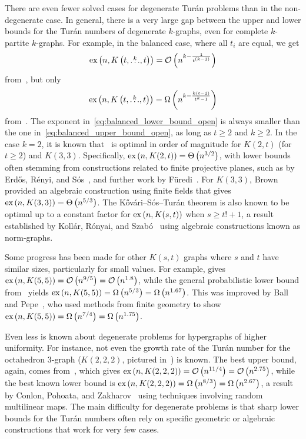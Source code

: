 There are even fewer solved cases for degenerate Turán problems than in the non-degenerate case.
In general, there is a very large gap between the upper and lower bounds for the Turán numbers of degenerate $k$-graphs,
even for complete $k$-partite $k$-graphs.
For example, in the balanced case, where all $t_i$ are equal, we get
\begin{equation} \label{eq:balanced_upper_bound_open}
    \text{ex} \left( n, K\left(t, \overset{k}{\dots}, t\right) \right) = \mathcal{O}\left(n^{k - \frac{1}{t^{(k-1)}}}\right)
\end{equation}
from~, but only
\begin{equation} \label{eq:balanced_lower_bound_open}
    \text{ex} \left( n, K\left(t, \overset{k}{\dots}, t\right) \right) = \Omega\left(n^{k - \frac{k(t-1)}{t^k - 1}}\right)
\end{equation}
from~.
The exponent in~\eqref{eq:balanced_lower_bound_open} is always
smaller than the one in~\eqref{eq:balanced_upper_bound_open},
as long as $t \geq 2$ and $k \geq 2$.
In the case $k=2$, it is known that~ is optimal in order of magnitude for $K(2, t)$ (for $t \geq 2$) and $K(3, 3)$.
Specifically, $\text{ex} \left( n, K(2, t) \right) = \Theta\left(n^{3/2}\right)$,
with lower bounds often stemming from constructions related to finite projective planes,
such as by Erdős, Rényi, and Sós~\cite{erdHos1966problem}, and further work by Füredi~\cite{furedi1996new}.
For $K(3,3)$, Brown~\cite{brown1966graphs} provided an algebraic construction using finite fields that gives
$\text{ex} \left( n, K(3, 3) \right) = \Theta\left(n^{5/3}\right)$.
The Kővári–Sós–Turán theorem is also known to be optimal up to a constant factor for $\text{ex} \left( n, K(s,t) \right)$ when $s \ge t!+1$, a result established by Kollár, Rónyai, and Szabó~\cite{kollar1996norm} using algebraic constructions known as norm-graphs.

Some progress has been made for other $K(s, t)$ graphs where $s$ and $t$ have similar sizes, particularly for small values.
For example,  gives
$\text{ex} \left( n, K(5,5) \right) = \mathcal{O}\left(n^{9/5}\right) = \mathcal{O}\left(n^{1.8}\right)$,
while the general probabilistic lower bound from~ yields
$\text{ex} \left( n, K(5,5) \right) = \Omega\left(n^{5/3}\right) = \Omega\left(n^{1.67}\right)$.
This was improved by Ball and Pepe~\cite{ball2012asymptotic}, who used methods from finite geometry to show $\text{ex} \left( n, K(5,5) \right) = \Omega\left(n^{7/4}\right) = \Omega\left(n^{1.75}\right)$.

Even less is known about degenerate problems for hypergraphs of higher uniformity.
For instance, not even the growth rate of the Turán number for the octahedron 3-graph
($K(2, 2, 2)$, pictured in~) is known.
The best upper bound, again, comes from~, which gives
$\text{ex} \left( n, K(2, 2, 2) \right) = \mathcal{O}\left(n^{11/4}\right) = \mathcal{O}\left(n^{2.75}\right)$,
while the best known lower bound is
$\text{ex} \left( n, K(2, 2, 2) \right) = \Omega\left(n^{8/3}\right) = \Omega\left(n^{2.67}\right)$,
a result by Conlon, Pohoata, and Zakharov~\cite{conlon2020random} using techniques involving random multilinear maps.
The main difficulty for degenerate problems is that sharp lower bounds for the Turán numbers
often rely on specific geometric or algebraic constructions that work for very few cases.

